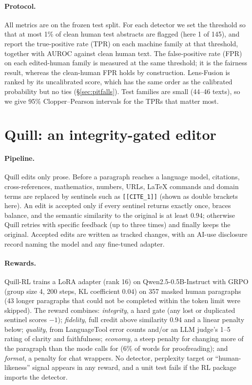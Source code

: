 \documentclass[11pt]{article}
\begin{document}
\paragraph{Protocol.}
All metrics are on the frozen test split.
For each detector we set the threshold so that at most 1\% of clean human test abstracts are flagged (here 1 of 145), and report the true-positive rate (TPR) on each machine family at that threshold, together with AUROC against clean human text.
The false-positive rate (FPR) on each edited-human family is measured at the same threshold; it is the fairness result, whereas the clean-human FPR holds by construction.
Lens-Fusion is ranked by its uncalibrated score, which has the same order as the calibrated probability but no ties (\S\ref{sec:pitfalls}).
Test families are small (44--46 texts), so we give 95\% Clopper--Pearson intervals for the TPRs that matter most.

\section{Quill: an integrity-gated editor}
\label{sec:quill}

\paragraph{Pipeline.}
Quill edits only prose.
Before a paragraph reaches a language model, citations, cross-references, mathematics, numbers, URLs, LaTeX commands and domain terms are replaced by sentinels such as \texttt{[[CITE\_1]]} (shown as double brackets here).
An edit is accepted only if every sentinel returns exactly once, braces balance, and the semantic similarity to the original is at least $0.94$; otherwise Quill retries with specific feedback (up to three times) and finally keeps the original.
Accepted edits are written as tracked changes, with an AI-use disclosure record naming the model and any fine-tuned adapter.

\paragraph{Rewards.}
Quill-RL trains a LoRA adapter (rank 16) on Qwen2.5-0.5B-Instruct with GRPO (group size 4, 200 steps, KL coefficient $0.04$) on 357 masked human paragraphs (43 longer paragraphs that could not be completed within the token limit were skipped).
The reward combines:
\emph{integrity}, a hard gate (any lost or duplicated sentinel scores $-1$);
\emph{fidelity}, full credit above similarity $0.94$ and a linear penalty below;
\emph{quality}, from LanguageTool error counts and/or an LLM judge's 1--5 rating of clarity and faithfulness;
\emph{economy}, a steep penalty for changing more of the paragraph than the mode calls for (6\% of words for proofreading); and
\emph{format}, a penalty for chat wrappers.
No detector, perplexity target or ``human-likeness'' signal appears in any reward, and a unit test fails if the RL package imports the detector.
\end{document}

